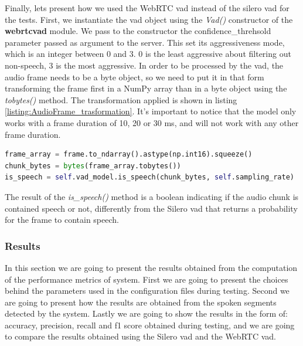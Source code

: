 \documentclass[../main.tex]{subfiles}
\begin{document}
Finally, lets present how we used the WebRTC vad instead of the silero vad for the tests. First, we instantiate the vad object using the \textit{Vad()} constructor of the \textbf{webrtcvad} module. We pass to the constructor the confidence\_threhsold parameter passed as argument to the server. This set its aggressiveness mode, which is an integer between 0 and 3. 0 is the least aggressive about filtering out non-speech, 3 is the most aggressive. In order to be processed by the vad, the audio frame needs to be a byte object, so we need to put it in that form transforming the frame first in a NumPy array than in a byte object using the \textit{tobytes()} method. The transformation applied is shown in listing \ref{listing:AudioFrame_trasformation}. It's important to notice that the model only works with a frame duration of 10, 20 or 30 ms, and will not work with any other frame duration.

\begin{lstlisting}[language=Python, caption={AudioFrame processing for the WebRTC vad}]
frame_array = frame.to_ndarray().astype(np.int16).squeeze()
chunk_bytes = bytes(frame_array.tobytes())
is_speech = self.vad_model.is_speech(chunk_bytes, self.sampling_rate)
\end{lstlisting}
\label{listing:AudioFrame_trasformation}

The result of the \textit{is\_speech()} method is a boolean indicating if the audio chunk is contained speech or not, differently from the Silero vad that returns a probability for the frame to contain speech.

\subsubsection{Results}

In this section we are going to present the results obtained from the computation of the performance metrics of system. First we are going to present the choices behind the parameters used in the configuration files during testing. Second we are going to present how the results are obtained from the spoken segments detected by the system. Lastly we are going to show the results in the form of: accuracy, precision, recall and f1 score obtained during testing, and we are going to compare the results obtained using the Silero vad and the WebRTC vad.
\end{document}
